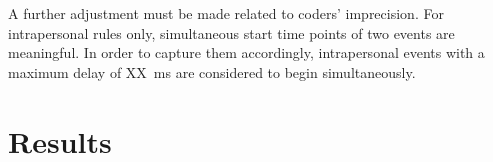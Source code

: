 A further adjustment must be made related to coders' imprecision. For intrapersonal rules only, simultaneous start time points of two events are meaningful. In order to capture them accordingly, intrapersonal events with a maximum delay of XX~ms are considered to begin simultaneously. 

\section{Results}

%
%
